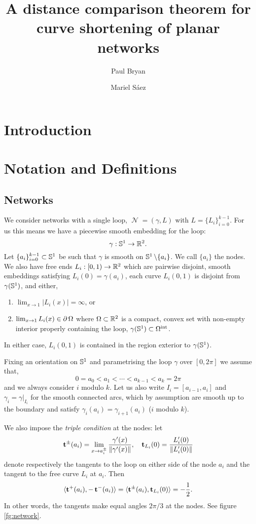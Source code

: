 \documentclass[11pt]{amsart}
\date{}
\author{Paul Bryan}
\author{Mariel S\'aez}
\title{A distance comparison theorem for curve shortening of planar networks}
\DeclareMathOperator{\network}{\mathcal{N}}
\begin{document}
\maketitle

\section{Introduction}
\label{sec:orgheadline1}
\section{Notation and Definitions}
\label{sec:orgheadline5}

\subsection{Networks}
\label{sec:orgheadline2}

We consider networks with a single loop, \(\network = (\gamma, L)\) with \(L = \{L_i\}_{i=0}^{k-1}\). For us this means we have a piecewise smooth embedding for the loop:
\[
\gamma : \mathbb{S}^1 \to \mathbb{R}^2.
\]
Let \(\{a_i\}_{i=0}^{k-1} \subset \mathbb{S}^1\) be such that \(\gamma\) is smooth on \(\mathbb{S}^1 \operatorname{\backslash} \{a_i\}\). We call \(\{a_i\}\) the nodes. We also have free ends \(L_i : [0, 1) \to \mathbb{R}^2\) which are pairwise disjoint, smooth embeddings satisfying \(L_i(0) = \gamma(a_i)\), each curve \(L_i(0, 1)\) is disjoint from \(\gamma(\mathbb{S}^1)\), and either,
\begin{enumerate}
\item \(\lim_{x\to 1} |L_i(x)| = \infty\), or
\item \(\lim_{x\to 1} L_i(x) \in \operatorname{\partial}{\Omega}\) where \(\Omega \subset \mathbb{R}^2\) is a compact, convex set with non-empty interior properly containing the loop, \(\gamma(\mathbb{S}^1) \subset {\Omega}^{\text{int}}\).
\end{enumerate}
In either case, \(L_i(0,1)\) is contained in the region exterior to \(\gamma(\mathbb{S}^1)\).

Fixing an orientation on \(\mathbb{S}^1\) and parametrising the loop \(\gamma\) over \([0, 2\pi]\) we assume that,
\[
0 = a_0 < a_1 < \cdots < a_{k-1} < a_k = 2\pi
\]
and we always consider \(i\) modulo \(k\). Let us also write \(I_i = [a_{i-1}, a_i]\) and \(\gamma_i = \gamma|_{I_i}\) for the smooth connected arcs, which by assumption are smooth up to the boundary and satisfy \(\gamma_i(a_i) = \gamma_{i+1}(a_i)\) (\(i\) modulo \(k\)).

We also impose the \emph{triple condition} at the nodes: let
\[
\operatorname{\mathbf{t}}^{\pm} (a_i) = \lim_{x\to a_i^{\pm}} \frac{\gamma'(x)}{\|\gamma'(x)\|}, \quad \operatorname{\mathbf{t}}_{L_i}(0) = \frac{L_i'(0)}{\|L_i'(0)\|}
\]
denote respectively the tangents to the loop on either side of the node \(a_i\) and the tangent to the free curve \(L_i\) at \(a_i\). Then
\begin{equation}
\label{eq:triplecondition}
\langle{\operatorname{\mathbf{t}}^+(a_i)},{-\operatorname{\mathbf{t}}^-(a_i)}\rangle = \langle{\operatorname{\mathbf{t}}^{\pm}(a_i)},{\operatorname{\mathbf{t}}_{L_i}(0)}\rangle = - \frac{1}{2}.
\end{equation}
In other words, the tangents make equal angles \(2\pi/3\) at the nodes. See figure \ref{fg:network}.
\end{document}
